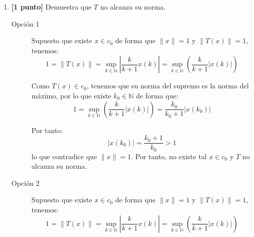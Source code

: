 \documentclass[12pt]{article}
\begin{document}
\begin{ejercicio}[7 puntos]
\begin{enumerate}[label=\alph*)]
                Tomando el límite cuando $n\to \infty$ obtenemos que $\|T\|\geq 1$, y como ya habíamos demostrado que $\|T\|\leq 1$, obtenemos que $\|T\| = 1$.
            \item \textbf{[1 punto]} Demuestra que $T$ no alcanza su norma.

                \begin{description}
                    \item[Opción 1] Supuesto que existe $x\in c_0$ de forma que $\|x\| =1$ y $\|T(x)\| = 1$, tenemos:
                    \begin{equation*}
                        1 = \|T(x)\| = \sup_{k\in \mathbb{N}}\left|\frac{k}{k+1}x(k)\right| = \sup_{k \in \mathbb{N}}\left(\frac{k}{k+1}|x(k)|\right)
                    \end{equation*}

                    Como $T(x)\in c_0$, tenemos que su norma del supremo es la norma del máximo, por lo que existe $k_0\in \mathbb{N}$ de forma que:
                    \begin{equation*}
                        1 = \sup_{k \in \mathbb{N}}\left(\frac{k}{k+1}|x(k)|\right) = \frac{k_0}{k_0+1}|x(k_0)|
                    \end{equation*}

                    Por tanto:
                    \begin{equation*}
                        |x(k_0)| = \frac{k_0+1}{k_0} > 1
                    \end{equation*}
                    lo que contradice que $\|x\| = 1$. Por tanto, no existe tal $x\in c_0$ y $T$ no alcanza su norma. 

                    \item[Opción 2] Supuesto que existe $x\in c_0$ de forma que $\|x\| =1$ y $\|T(x)\| = 1$, tenemos:
                    \begin{equation*}
                        1 = \|T(x)\| = \sup_{k\in \mathbb{N}}\left|\frac{k}{k+1}x(k)\right| = \sup_{k \in \mathbb{N}}\left(\frac{k}{k+1}|x(k)|\right)
                    \end{equation*}


\end{description}
\end{enumerate}
\end{ejercicio}
\end{document}
